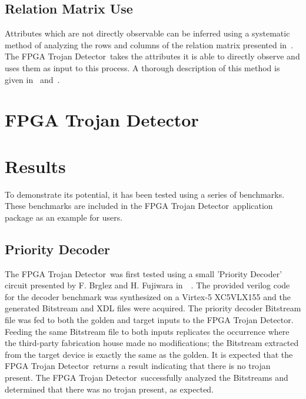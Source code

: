 \documentclass[conference]{IEEEtran}
\newcommand{\Name}{\acrshort{FPGA} Trojan Detector}
\newcommand{\NameNoPeriod}{\Name~}
\begin{document}
\subsection{Relation Matrix Use} \label{sec:matrixUse}
Attributes which are not directly observable can be inferred using a systematic method of analyzing the rows and columns of the relation matrix presented in~\cite{samerAttribute}.
The \NameNoPeriod takes the attributes it is able to directly observe and uses them as input to this process.
A thorough description of this method is given in~\cite{samerDissertation} and~\cite{meCategorization}.
\section{\Name}
\section{Results}
To demonstrate its potential, it has been tested using a series of benchmarks.
These benchmarks are included in the \NameNoPeriod application package as an example for users.
\subsection{Priority Decoder} \label{sec:priorityDecoder}
The \NameNoPeriod was first tested using a small 'Priority Decoder' circuit presented by F. Brglez and H. Fujiwara
in~~\cite{iscas85}.
The provided verilog code for the decoder benchmark was synthesized on a Virtex-5 XC5VLX155 and the generated \gls{Bitstream} and \acrshort{XDL} files were acquired.
The priority decoder \gls{Bitstream} file was fed to both the \gls{golden} and \gls{target} inputs to the \Name.
Feeding the same \gls{Bitstream} file to both inputs replicates the occurrence where the third-party fabrication house made no modifications; the \gls{Bitstream} extracted from the \gls{target} device is exactly the same as the \gls{golden}.
It is expected that the \NameNoPeriod returns a result indicating that there is no trojan present.
The \NameNoPeriod successfully analyzed the \gls{Bitstream}s and determined that there was no trojan present, as expected.
\end{document}
